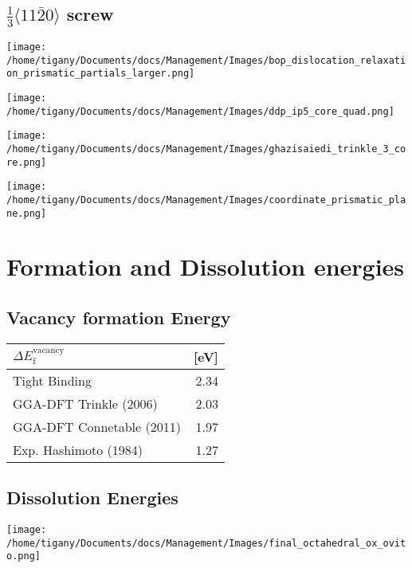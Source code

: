 \documentclass[11pt]{article}
\begin{document}
\subsection*{\(\frac{1}{3}\langle11\bar{2}0\rangle\) screw}
\label{sec:org37dab83}
\begin{center}
\texttt{[image: /home/tigany/Documents/docs/Management/Images/bop\_dislocation\_relaxation\_prismatic\_partials\_larger.png]}
\end{center}
\begin{center}
\texttt{[image: /home/tigany/Documents/docs/Management/Images/ddp\_ip5\_core\_quad.png]}
\end{center}

\begin{center}
\texttt{[image: /home/tigany/Documents/docs/Management/Images/ghazisaiedi\_trinkle\_3\_core.png]}
\end{center}

\begin{center}
\texttt{[image: /home/tigany/Documents/docs/Management/Images/coordinate\_prismatic\_plane.png]}
\end{center}



\section*{Formation and Dissolution energies}
\label{sec:orgd98df6b}

\subsection*{Vacancy formation Energy}
\label{sec:orgf731b00}

\begin{center}
\begin{tabular}{lr}
\(\Delta E_{\text{f}}^{\text{vacancy}}\) & [eV]\\
\hline
Tight Binding & 2.34\\
GGA-DFT Trinkle (2006) & 2.03\\
GGA-DFT Connetable (2011) & 1.97\\
Exp. Hashimoto (1984) & 1.27\\
\hline
\end{tabular}
\end{center}

\subsection*{Dissolution Energies}
\label{sec:orga475e78}
\begin{center}
\texttt{[image: /home/tigany/Documents/docs/Management/Images/final\_octahedral\_ox\_ovito.png]}
\end{center}
\end{document}
